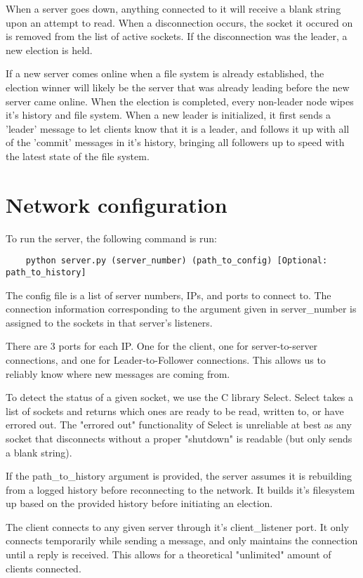 \documentclass[12pt]{scrartcl}
\begin{document}
	When a server goes down, anything connected to it will receive a blank string upon an attempt to read. When a disconnection occurs, the socket it occured on is removed from the list of active sockets. If the disconnection was the leader, a new election is held.

	If a new server comes online when a file system is already established, the election winner will likely be the server that was already leading before the new server came online. When the election is completed, every non-leader node wipes it's history and file system. When a new leader is initialized, it first sends a 'leader' message to let clients know that it is a leader, and follows it up with all of the 'commit' messages in it's history, bringing all followers up to speed with the latest state of the file system.

	\section*{Network configuration}

	To run the server, the following command is run:
	\begin{lstlisting}
	python server.py (server_number) (path_to_config) [Optional: path_to_history]
	\end{lstlisting}

	The config file is a list of server numbers, IPs, and ports to connect to. The connection information corresponding to the argument given in server\_number is assigned to the sockets in that server's listeners.

	There are 3 ports for each IP. One for the client, one for server-to-server connections, and one for Leader-to-Follower connections. This allows us to reliably know where new messages are coming from.

	To detect the status of a given socket, we use the C library Select. Select takes a list of sockets and returns which ones are ready to be read, written to, or have errored out. The "errored out" functionality of Select is unreliable at best as any socket that disconnects without a proper "shutdown" is readable (but only sends a blank string).

	If the path\_to\_history argument is provided, the server assumes it is rebuilding from a logged history before reconnecting to the network. It builds it's filesystem up based on the provided history before initiating an election.

	The client connects to any given server through it's client\_listener port. It only connects temporarily while sending a message, and only maintains the connection until a reply is received. This allows for a theoretical "unlimited" amount of clients connected.
\end{document}
